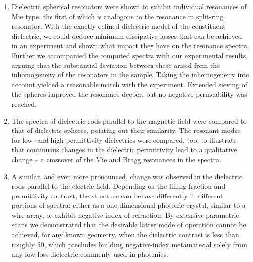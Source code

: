 \begin{enumerate}
{} 
\item{Dielectric spherical resonators were shown to exhibit individual resonances of Mie type, the first of which is analogous to the resonance in split-ring resonator. With the exactly defined dielectric model of the constituent dielectric, we could deduce minimum dissipative losses that can be achieved in an experiment and shown what impact they have on the resonance spectra. Further we accompanied the computed spectra with our experimental results, arguing that the substantial deviation between these arised from the inhomogeneity of the resonators in the sample. Taking the inhomogeneity into account yielded a reasonable match with the experiment. Extended sieving of the spheres improved the resonance deeper, but no negative permeability was reached.
} 
\item{The spectra of dielectric rods parallel to the magnetic field were compared to that of dielectric spheres, pointing out their similarity. The resonant modes for low- and high-permittivity dielectrics were compared, too, to illustrate that continuous changes in the dielectric permittivity lead to a qualitative change -- a crossover of the Mie and Bragg resonances in the spectra.
} 
\item{A similar, and even more pronounced, change was observed in the dielectric rods parallel to the electric field. Depending on the filling fraction and permittivity contrast, the structure can behave differently in different portions of spectra: either as a one-dimensional photonic crystal, similar to a wire array, or exhibit negative index of refraction. By extensive parametric scans we demonstrated that the desirable latter mode of operation  cannot be achieved, for any known geometry, when the dielectric contrast is less than roughly 50, which precludes building negative-index metamaterial solely from any low-loss dielectric commonly used in photonics. 
}
\end{enumerate}
